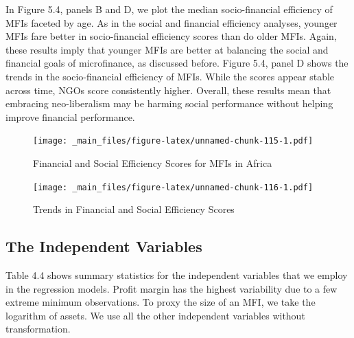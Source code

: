 \documentclass[a4paper, nobind]{templates/ociamthesis}
\begin{document}
In Figure 5.4, panels B and D, we plot the median socio-financial efficiency of MFIs faceted by age. As in the social and financial efficiency analyses, younger MFIs fare better in socio-financial efficiency scores than do older MFIs. Again, these results imply that younger MFIs are better at balancing the social and financial goals of microfinance, as discussed before. Figure 5.4, panel D shows the trends in the socio-financial efficiency of MFIs. While the scores appear stable across time, NGOs score consistently higher. Overall, these results mean that embracing neo-liberalism may be harming social performance without helping improve financial performance.

\begin{landscape}

\newpage

\begin{figure}
\centering
\texttt{[image: \_main\_files/figure-latex/unnamed-chunk-115-1.pdf]}
\caption{\label{fig:unnamed-chunk-115}Financial and Social Efficiency Scores for MFIs in Africa}
\end{figure}

\end{landscape}

\newpage

\begin{landscape}

\begin{figure}
\centering
\texttt{[image: \_main\_files/figure-latex/unnamed-chunk-116-1.pdf]}
\caption{\label{fig:unnamed-chunk-116}Trends in Financial and Social Efficiency Scores}
\end{figure}

\end{landscape}

\hypertarget{the-independent-variables}{%
\subsection{The Independent Variables}\label{the-independent-variables}}

Table 4.4 shows summary statistics for the independent variables that we employ in the regression models. Profit margin has the highest variability due to a few extreme minimum observations. To proxy the size of an MFI, we take the logarithm of assets. We use all the other independent variables without transformation.
\end{document}

